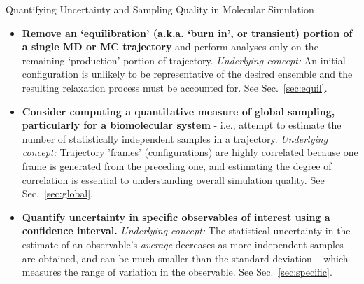 \documentclass[9pt,bestpractices]{livecoms}
\begin{document}
\begin{Checklists*}[p!]
\begin{checklist}{Quantifying Uncertainty and Sampling Quality in Molecular Simulation}
\begin{itemize}
\begin{itemize}
    \item If multiple runs have been performed, compare time series, distributions, and cluster populations from the different simulations.
    \item An individual trajectory can be divided into two parts and analyzed as if two simulations had been run.
    \item For individual runs, perform pairwise RMSD visual analysis as described below.
    \end{itemize}
\item
 \textbf{Remove an ‘equilibration' (a.k.a. `burn in', or transient) portion of a single MD or MC trajectory} and perform analyses only on the remaining ‘production’ portion of trajectory.  \emph{Underlying concept:} An initial configuration is unlikely to be representative of the desired ensemble and the resulting relaxation process must be accounted for.  See Sec.\ \ref{sec:equil}.
\item
 \textbf{Consider computing a quantitative measure of global sampling, particularly for a biomolecular system} - i.e., attempt to estimate the number of statistically independent samples in a trajectory.  \emph{Underlying concept:} Trajectory 'frames' (configurations) are highly correlated because one frame is generated from the preceding one, and estimating the degree of correlation is essential to understanding overall simulation quality.  See Sec.\ \ref{sec:global}.
\item
 \textbf{Quantify uncertainty in specific observables of interest using a confidence interval.}  \emph{Underlying concept:} The statistical uncertainty in the estimate of an observable's \emph{average} decreases as more independent samples are obtained, and can be much smaller than the standard deviation -- which measures the range of variation in the observable.  See Sec.\ \ref{sec:specific}.

\end{itemize}
\end{checklist}
\end{Checklists*}
\end{document}
